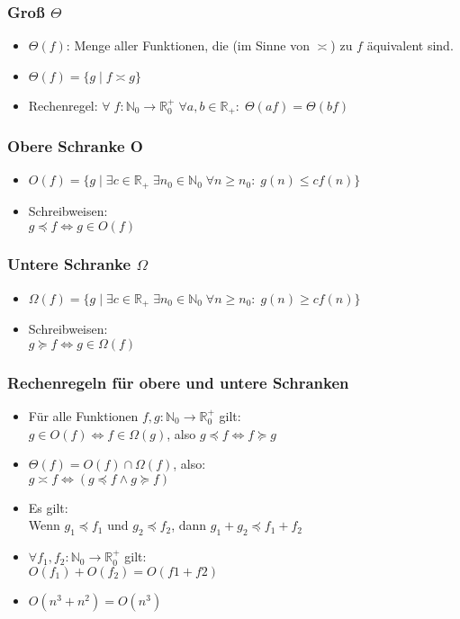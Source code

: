 \documentclass{article}
\newcommand{\Nz}{{\mathbb{N}_0}} %
\newcommand{\R}{\mathbb{R}} %
\newcommand{\important}[1]{\textcolor{importantColor}{#1}}
\newcommand{\example}[1]{\textit{Beispiel: }#1}
\newcommand{\set}[1]{\{#1\}}
\begin{document}
\subsubsection{Groß $\Theta$}
\begin{itemize}
    \item \important{$\Theta(f)$}: Menge aller Funktionen, die (im Sinne von $\asymp$) zu $f$ äquivalent sind.
    \item $\Theta(f)=\set{g \mid f\asymp g}$
    \item Rechenregel: $\forall\; f:\Nz\to\R_0^+\;\forall a,b\in\R_+:\;\Theta(af)=\Theta(bf)$ 
\end{itemize}

\subsubsection{Obere Schranke O}
\begin{itemize}
    \item \important{$O(f)=\set{g\mid\exists c\in\R_+\;\exists n_0\in\Nz\;\forall n\geq n_0:\;g(n)\leq cf(n)}$}
    \item Schreibweisen:\\
    $g\preceq f \iff g\in O(f)$
\end{itemize}

\subsubsection{Untere Schranke $\Omega$}
\begin{itemize}
    \item \important{$\Omega(f)=\set{g\mid\exists c\in\R_+\;\exists n_0\in\Nz\;\forall n\geq n_0:\;g(n)\geq cf(n)}$}
    \item Schreibweisen:\\
    $g\succeq f \iff g\in \Omega(f)$
\end{itemize}

\subsubsection{Rechenregeln für obere und untere Schranken}
\begin{itemize}
    \item Für alle Funktionen $f,g: \Nz\to\R_0^+$ gilt:\\
    $g\in O(f) \iff f\in\Omega(g)$, also $g\preceq f\iff f\succeq g$
    \item $\Theta(f) = O(f)\cap\Omega(f)$, also:\\
    $g\asymp f \iff (g\preceq f \land g \succeq f)$
    \item Es gilt:\\
    Wenn $g_1\preceq f_1$ und $g_2\preceq f_2$, dann $g_1+g_2 \preceq f_1+f_2$
    \item $\forall f_1,f_2:\Nz\to\R_0^+$ gilt:\\
    $O(f_1)+O(f_2)=O(f1+f2)$
    \item \example $O(n^3+n^2)=O(n^3)$
\end{itemize}
\end{document}
